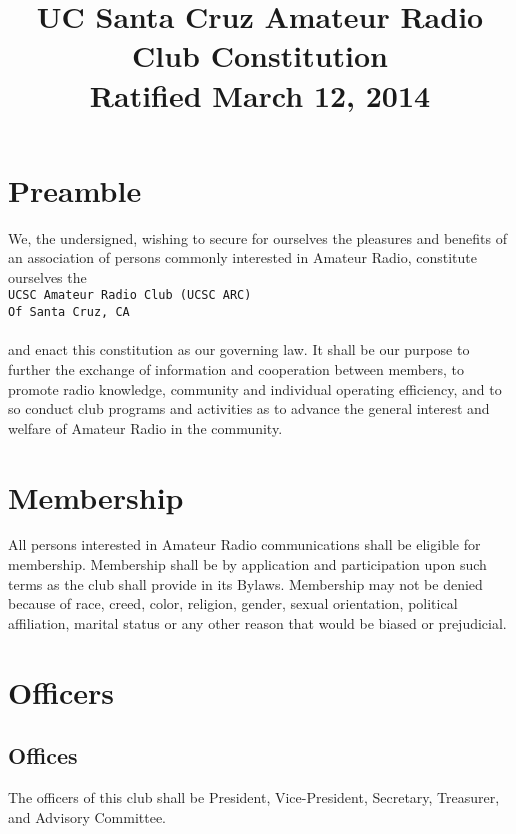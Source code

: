 \documentclass{report}
\begin{document}
\title{UC Santa Cruz Amateur Radio Club Constitution \\ \small{Ratified March 12, 2014}}
\author{}
\date{}
\maketitle

\tableofcontents

\pagebreak

\chapter{Preamble}
We, the undersigned, wishing to secure for ourselves the pleasures and benefits of an association of persons commonly interested in Amateur Radio, constitute ourselves the\\

\indent \texttt{UCSC Amateur Radio Club (UCSC ARC)\\ \indent Of Santa Cruz, CA}\\ \\
and enact this constitution as our governing law. It shall be our purpose to further the exchange of information and cooperation between members, to promote radio knowledge, community and individual operating efficiency, and to so conduct club programs and activities as to advance the general interest and welfare of Amateur Radio in the community. 

\chapter{Membership}
All persons interested in Amateur Radio communications shall be eligible for membership. Membership shall be by application and participation upon such terms as the club shall provide in its Bylaws. Membership may not be denied because of race, creed, color, religion, gender, sexual orientation, political affiliation, marital status or any other reason that would be biased or prejudicial.
\chapter{Officers}

\section{Offices}

The officers of this club shall be President, Vice-President, Secretary, Treasurer, and Advisory Committee.
\end{document}
